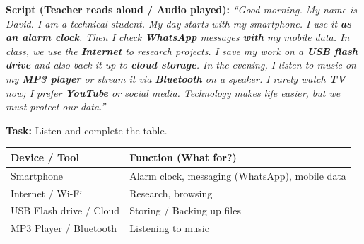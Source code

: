 \documentclass[11pt]{article}
\begin{document}
\begin{experience}
\textbf{Script (Teacher reads aloud / Audio played):}
\emph{``Good morning. My name is David. I am a technical student. My day starts with my smartphone. I use it \textbf{as an alarm clock}. Then I check \textbf{WhatsApp} messages \textbf{with} my mobile data. In class, we use the \textbf{Internet} to research projects. I save my work on a \textbf{USB flash drive} and also back it up to \textbf{cloud storage}. In the evening, I listen to music on my \textbf{MP3 player} or stream it via \textbf{Bluetooth} on a speaker. I rarely watch \textbf{TV} now; I prefer \textbf{YouTube} or social media. Technology makes life easier, but we must protect our data.''}

\textbf{Task:} Listen and complete the table.
\begin{center}
\begin{tabularx}{\linewidth}{|l|X|}\hline
\textbf{Device / Tool} & \textbf{Function (What for?)} \\ \hline
Smartphone & Alarm clock, messaging (WhatsApp), mobile data \\ \hline
Internet / Wi-Fi & Research, browsing \\ \hline
USB Flash drive / Cloud & Storing / Backing up files \\ \hline
MP3 Player / Bluetooth & Listening to music \\ \hline
\end{tabularx}
\end{center}
\end{experience}
\end{document}

